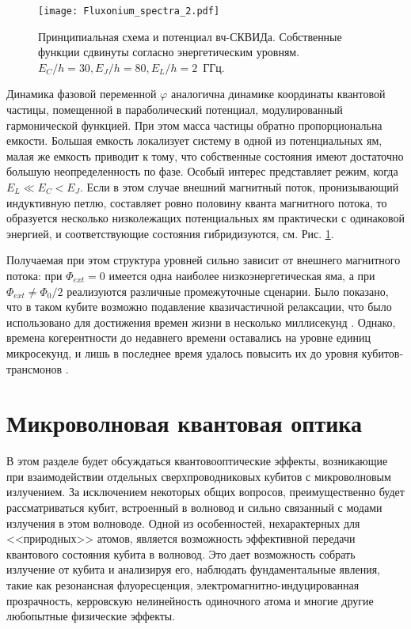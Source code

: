 \begin{figure}[h]
	\centering
	\texttt{[image: Fluxonium\_spectra\_2.pdf]}	
	\parbox[t]{0.87\textwidth}{ \caption[Спектр вч-СКВИДа]{Принципиальная схема и потенциал вч-СКВИДа. Собственные функции сдвинуты согласно энергетическим уровням.  $E_C/h = 30, E_J/h=80, E_L/h=2 $~ГГц.}\label{fig: spec_rfsquid}}
\end{figure}
Динамика фазовой переменной $\varphi$ аналогична динамике координаты квантовой частицы, помещенной в параболический потенциал, модулированный гармонической функцией. При этом масса частицы обратно пропорциональна емкости. Большая емкость локализует систему в одной из потенциальных ям, малая же емкость приводит к тому, что собственные состояния имеют достаточно большую неопределенность по фазе. Особый интерес представляет режим, когда $E_L \ll E_C < E_J$. Если в этом случае внешний магнитный поток, пронизывающий индуктивную петлю, составляет ровно половину кванта магнитного потока, то образуется несколько низколежащих потенциальных ям практически с одинаковой энергией, и соответствующие состояния гибридизуются, см. Рис. \ref{fig: spec_rfsquid}.

Получаемая при этом структура уровней сильно зависит от внешнего магнитного потока: при $\Phi_{ext}=0$ имеется одна наиболее низкоэнергетическая яма, а при $\Phi_{ext} \ne \Phi_0/2$ реализуются различные промежуточные сценарии. Было показано, что в таком кубите возможно подавление квазичастичной релаксации, что было использовано для достижения времен жизни в несколько миллисекунд \cite{pop2014coherent}. Однако, времена когерентности до недавнего времени оставались на уровне единиц микросекунд, и лишь в последнее время удалось повысить их до уровня кубитов-трансмонов \cite{grunhaupt2019granular}. 
\section{Микроволновая квантовая оптика}
\label{sec: microwave qo}

В этом разделе будет обсуждаться квантовооптические эффекты, возникающие при взаимодействии отдельных сверхпроводниковых кубитов с микроволновым излучением. За исключением некоторых общих вопросов, преимущественно будет рассматриваться кубит, встроенный в волновод и сильно связанный с модами излучения в этом волноводе. Одной из особенностей, нехарактерных для <<природных>> атомов, является возможность эффективной передачи квантового состояния кубита в волновод. Это дает возможность собрать излучение от кубита и анализируя его, наблюдать фундаментальные явления, такие как резонансная флуоресценция, электромагнитно-индуцированная прозрачность, керровскую нелинейность одиночного атома и многие другие любопытные физические эффекты. 
